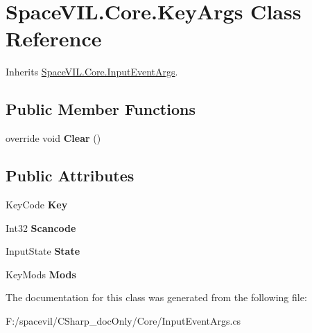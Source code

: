 \hypertarget{class_space_v_i_l_1_1_core_1_1_key_args}{}\section{Space\+V\+I\+L.\+Core.\+Key\+Args Class Reference}
\label{class_space_v_i_l_1_1_core_1_1_key_args}


Inherits \mbox{\hyperlink{class_space_v_i_l_1_1_core_1_1_input_event_args}{Space\+V\+I\+L.\+Core.\+Input\+Event\+Args}}.

\subsection*{Public Member Functions}
\begin{DoxyCompactItemize}
\item 
\mbox{\label{class_space_v_i_l_1_1_core_1_1_key_args_a1521dd5bebbcc13ac6f1bcffe9dac487}} 
override void {\bfseries Clear} ()
\end{DoxyCompactItemize}
\subsection*{Public Attributes}
\begin{DoxyCompactItemize}
\item 
\mbox{\label{class_space_v_i_l_1_1_core_1_1_key_args_a15ddee7149bbe1aebc6449a7e7952a25}} 
Key\+Code {\bfseries Key}
\item 
\mbox{\label{class_space_v_i_l_1_1_core_1_1_key_args_af188536c7b040c27d4348e02961e955e}} 
Int32 {\bfseries Scancode}
\item 
\mbox{\label{class_space_v_i_l_1_1_core_1_1_key_args_a605a658b9d5ce2855a6a4730dc03d2ce}} 
Input\+State {\bfseries State}
\item 
\mbox{\label{class_space_v_i_l_1_1_core_1_1_key_args_a00396e83c43c0c8ffd01e9d320a983c1}} 
Key\+Mods {\bfseries Mods}
\end{DoxyCompactItemize}


The documentation for this class was generated from the following file\+:\begin{DoxyCompactItemize}
\item 
F\+:/spacevil/\+C\+Sharp\+\_\+doc\+Only/\+Core/Input\+Event\+Args.\+cs\end{DoxyCompactItemize}
